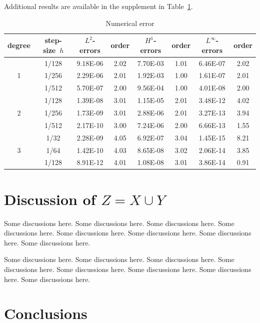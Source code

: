 \documentclass[10pt,reqno,final]{article}
\theoremstyle{plain}
\theoremstyle{definition}
\theoremstyle{remark}
\numberwithin{equation}{section}
\numberwithin{figure}{section}
\numberwithin{table}{section}
\begin{document}
Additional results are available in the supplement in Table~\ref{tab:foo}.

\begin{table}[!htp]
\centering
\renewcommand\arraystretch{1.2} %
\caption{Numerical error}
\label{tab:foo}
\begin{tabular}{c|c|cc|cc|cc}
\hline
degree & step-size~$h$ & $L^2$-errors & order & $H^1$-errors & order & $L^\infty$-errors & order \\
\hline
   &  1/128    & 9.18E-06    &2.02    & 7.70E-03  &1.01       & 6.46E-07    &2.02   \\
1  &  1/256    & 2.29E-06    &2.01    & 1.92E-03  &1.00       & 1.61E-07    &2.01   \\
   &  1/512    & 5.70E-07    &2.00    & 9.56E-04  &1.00       & 4.01E-08    &2.00   \\
\hline  %
   &  1/128    & 1.39E-08    &3.01    & 1.15E-05  &2.01       & 3.48E-12   &4.02    \\
2  &  1/256    & 1.73E-09    &3.01    & 2.88E-06  &2.01       & 3.27E-13   &3.94    \\
   &  1/512    & 2.17E-10    &3.00    & 7.24E-06  &2.00       & 6.66E-13   &1.55    \\
\hline  %
   &  1/32     & 2.28E-09    &4.05    & 6.92E-07  &3.04       & 1.45E-15   &8.21    \\
3  &  1/64     & 1.42E-10    &4.03    & 8.65E-08  &3.02       & 2.06E-14   &3.85    \\
   &  1/128    & 8.91E-12    &4.01    & 1.08E-08  &3.01       & 3.86E-14   &0.91    \\
\hline
\end{tabular}
\end{table}


\section{Discussion of \texorpdfstring{{\boldmath$Z=X \cup Y$}}{Z = X union Y}}
\label{sec:discussion}

Some discussions here. Some discussions here. Some discussions here.
Some discussions here. Some discussions here. Some discussions here.
Some discussions here. Some discussions here.

Some discussions here. Some discussions here. Some discussions here.
Some discussions here. Some discussions here. Some discussions here.
Some discussions here. Some discussions here.

\section{Conclusions}
\label{sec:conclusions}
\end{document}
